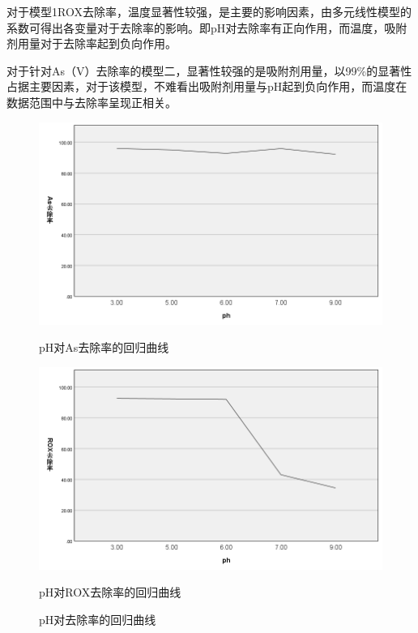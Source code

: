 \documentclass[AutoFakeBold]{ctexart}
\begin{document}
	\songti{}对于模型1ROX去除率，温度显著性较强，是主要的影响因素，由多元线性模型的系数可得出各变量对于去除率的影响。即pH对去除率有正向作用，而温度，吸附剂用量对于去除率起到负向作用。
	
	\songti{}对于针对As（V）去除率的模型二，显著性较强的是吸附剂用量，以99\%的显著性占据主要因素，对于该模型，不难看出吸附剂用量与pH起到负向作用，而温度在数据范围中与去除率呈现正相关。
	

	
	
	\begin{figure}[H]
		\centering
		\begin{minipage}{0.45\textwidth}
			\centering
			\includegraphics[width=\linewidth]{phAs.png}
			\caption*{pH对As去除率的回归曲线}
			\label{fig:image1}
		\end{minipage}
		\hfill
		\begin{minipage}{0.45\textwidth}
			\centering
			\includegraphics[width=\linewidth]{phROX.png}
			\caption*{pH对ROX去除率的回归曲线}
			\label{fig:image2}
		\end{minipage}
		\caption{pH对去除率的回归曲线}
	\end{figure}
\end{document}
